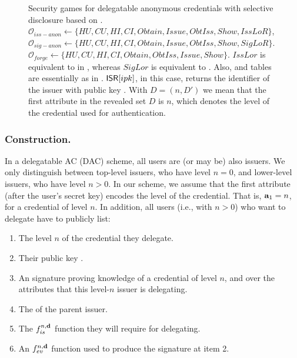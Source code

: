\begin{figure}[ht!]
{  }
  \caption{Security games for delegatable anonymous credentials with selective
    disclosure based on \cite{fhs19}. $\mathcal{O}_{iss-anon} \gets \lbrace HU,
    CU,HI,CI,Obtain,Issue,ObtIss,Show,IssLoR\rbrace$, $\mathcal{O}_{sig-anon}
    \gets \lbrace HU,CU,HI,CI,Obtain,Issue,ObtIss,Show,SigLoR\rbrace$.
    $\mathcal{O}_{forge} \gets \lbrace HU,CU,HI,CI,Obtain,ObtIss,Issue,Show
    \rbrace$. $IssLor$ is equivalent to \OBTCHALb in \UAS, whereas $SigLor$ is
    equivalent to \CHALb. Also, \OWNR and \ATTR tables are essentially as in
    . $\mathsf{ISR}[ipk]$, in this case, returns the identifier
    of the issuer with public key \ipk. With $D =
    (n,D')$ we mean that the first attribute in the revealed set $D$ is $n$,
    which denotes the level of the credential used for authentication.}
  \label{fig:model-dac}  
\end{figure}

\subsubsection{\CUASDAC Construction.} %
In a delegatable AC (DAC) scheme, all users are (or may be) also issuers. We
only distinguish between top-level issuers, who have level $n=0$, and
lower-level issuers, who have level $n>0$. In our \CUASDAC scheme, we assume
that the first attribute (after the user's secret key) encodes the level of
the credential. That is, $\mathbf{a}_1=n$, for a credential of level $n$. In
addition, all users (i.e., with $n>0$) who want to delegate have to publicly
list:

\begin{enumerate}
\item The level $n$ of the credential they delegate.
\item Their public key \ipk.
\item An \UAS signature proving knowledge of a credential of level $n$, and over
  the attributes that this level-$n$ issuer is delegating.
\item The \ipk of the parent issuer.
\item The $f_{is}^{n,\mathbf{d}}$ function they will require for delegating.
\item An $f_{ev}^{n,\mathbf{d}}$ function used to produce the signature at item 2.
\end{enumerate}

